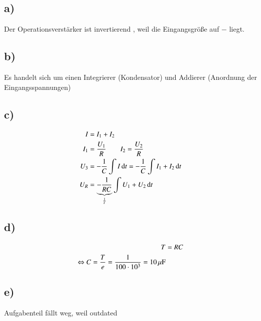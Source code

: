 \subsection*{a)}

Der Operationsverstärker ist invertierend , weil die Eingangsgröße auf $-$ liegt.

\subsection*{b)}

Es handelt sich um einen Integrierer (Kondensator) und Addierer (Anordnung der Eingangsspannungen)


\subsection*{c)}

\begin{align*}
I &= I_1 + I_2 \\
I_1 &= \frac{U_1}{R} \qquad I_2 = \frac{U_2}{R} \\
U_3 &= - \frac{1}{C} \int I \, \mathrm d t = - \frac{1}{C} \int I_1 + I_2 \, \mathrm d t \\
U_R &= \underbrace{ - \frac{1}{RC}}_{\frac{1}{T}} \int U_1 + U_2 \, \mathrm d t
\end{align*}

\subsection*{d)}

\begin{align*}
T &= RC \\ 
\Leftrightarrow C = \frac{T}{e} = \frac{1}{100 \cdot 10^3} = \unit[10]{\mu F}
\end{align*}


\subsection*{e)}

Aufgabenteil fällt weg, weil outdated





